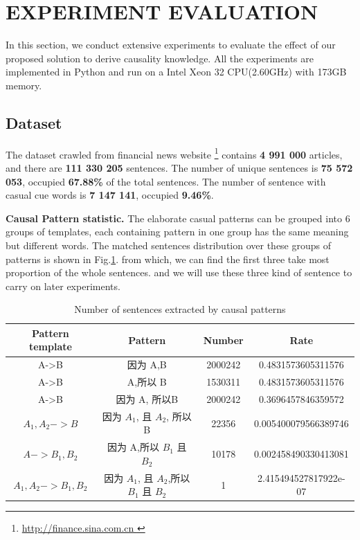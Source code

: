 \section{EXPERIMENT EVALUATION}
In this section, we conduct extensive experiments to evaluate the effect of our proposed solution to derive causality knowledge. All the experiments are implemented in Python and run on a Intel Xeon 32 CPU(2.60GHz) with 173GB memory.


\subsection{Dataset}
The dataset crawled from financial news website \footnote{ \url { http://finance.sina.com.cn }} contains \textbf{4 991 000} articles, and there are \textbf{111 330 205} sentences. The number of unique sentences is \textbf{75 572 053}, occupied  \textbf{67.88\%} of the total sentences. The number of sentence with casual cue words is \textbf{7 147 141}, occupied \textbf{9.46\%}.

\textbf{Causal Pattern statistic.} The elaborate casual patterns can be grouped into 6 groups of templates, each containing pattern in one group  has the same meaning but different words. The matched sentences distribution over these groups of patterns is shown in Fig.\ref{tab3}. from which, we can find the first three take most proportion of the whole sentences. and we will use these three kind of sentence to carry on later experiments.
\begin{table}[t]
	\caption{Number of sentences extracted by causal patterns}
	\begin{center}
		\begin{tabular}{|c|c|c|c|}
			\hline
			\textbf{Pattern template}& \textbf{Pattern}& \textbf{Number}& \textbf{Rate}\\
			\hline
			A->B&因为 A,B&2000242&0.4831573605311576\\
			\hline
			A->B&A,所以 B&1530311&0.4831573605311576\\
			\hline
			A->B&因为 A, 所以B&2000242&0.3696457846359572\\
			\hline
			$A_1,A_2->B$&因为 $A_1$, 且 $A_2$, 所以 B&22356&0.005400079566389746\\
			\hline
			$A->B_1,B_2$&因为 A,所以 $B_1$ 且 $B_2$&10178&0.002458490330413081\\
			\hline
			$A_1,A_2->B_1,B_2$&因为 $A_1$, 且 $A_2$,所以 $B_1$  且 $B_2$&1&2.415494527817922e-07\\
			\hline
		\end{tabular}
		\label{tab3}
	\end{center}
\end{table}	



